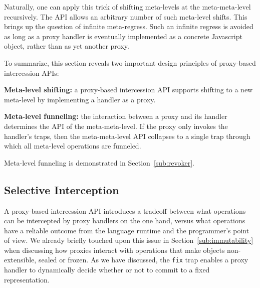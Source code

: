 \documentclass{sig-alternate}
\begin{document}
Naturally, one can apply this trick of shifting meta-levels at the meta-meta-level recursively. The API allows an arbitrary number of such meta-level shifts. This brings up the question of infinite meta-regress. Such an infinite regress is avoided as long as a proxy handler is eventually implemented as a concrete Javascript object, rather than as yet another proxy.

To summarize, this section reveals two important design principles of proxy-based intercession APIs:

\textbf{Meta-level shifting:} a proxy-based intercession API supports shifting to a new meta-level by implementing a handler as a proxy.

\textbf{Meta-level funneling:} the interaction between a proxy and its handler determines the API of the meta-meta-level. If the proxy only invokes the handler's traps, then the meta-meta-level API collapses to a single trap through which all meta-level operations are funneled.

Meta-level funneling is demonstrated in Section~\ref{sub:revoker}.



\subsection{Selective Interception}
\label{sub:selective}

A proxy-based intercession API introduces a tradeoff between what operations can be intercepted by proxy handlers on the one hand, versus what operations have a reliable outcome from the language runtime and the programmer's point of view. We already briefly touched upon this issue in Section~\ref{sub:immutability} when discussing how proxies interact with operations that make objects non-extensible, sealed or frozen. As we have discussed, the \texttt{fix} trap enables a proxy handler to dynamically decide whether or not to commit to a fixed representation.
\end{document}
